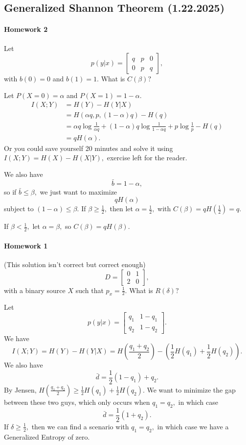 \documentclass[12pt]{article}
\theoremstyle{remark}
\begin{document}
\subsection{Generalized Shannon Theorem (1.22.2025)}
\paragraph{Homework 2}
Let \[p(y|x)=\begin{bmatrix}q&p&0\\0&p&q\end{bmatrix},\] with $b(0)=0$ and $b(1)=1.$ What is $C(\beta)?$

Let $P(X=0)=\alpha$ and $P(X=1)=1-\alpha.$
\begin{align*}I(X;Y)&=H(Y)-H(Y|X)\\&=H(\alpha q,p,(1-\alpha)q)-H(q)\\&=\alpha q\log\frac{1}{\alpha q}+(1-\alpha)q\log\frac{1}{1-\alpha q}+p\log\frac{1}{p}-H(q)\\&=qH(\alpha).\end{align*}
Or you could save yourself 20 minutes and solve it using $I(X;Y)=H(X)-H(X|Y),$ exercise left for the reader.

We also have
\[\bar{b}=1-\alpha,\] so if $\bar{b}\le\beta,$ we just want to maximize
\[qH(\alpha)\] subject to $(1-\alpha)\le \beta.$ If $\beta\ge\frac{1}{2},$ then let $\alpha=\frac{1}{2},$ with $C(\beta)=qH(\frac{1}{2})=q.$

If $\beta<\frac{1}{2},$ let $\alpha=\beta,$ so $C(\beta)=qH(\beta).$

\paragraph{Homework 1}
(This solution isn't correct but correct enough)
\[D=\begin{bmatrix}0&1\\2&0\end{bmatrix},\] with a binary source $X$ such that $p_x=\frac{1}{2}.$ What is $R(\delta)?$

Let 
\[p(y|x)=\begin{bmatrix}
    q_1&1-q_1\\
    q_2&1-q_2
\end{bmatrix}.\]
We have
\[I(X;Y)=H(Y)-H(Y|X)=H\left(\frac{q_1+q_2}{2}\right)-\left(\frac{1}{2}H(q_1)+\frac{1}{2}H(q_2)\right).\]
We also have
\[\bar{d}=\frac{1}{2}(1-q_1)+q_2.\]
By Jensen, $H(\frac{q_1+q_2}{2})\ge\frac{1}{2}H(q_1)+\frac{1}{2}H(q_2).$ We want to minimize the gap between these two guys, which only occurs when $q_1=q_2,$ in which case
\[\bar{d}=\frac{1}{2}(1+q_2).\] If $\delta\ge\frac{1}{2},$ then we can find a scenario with $q_1=q_2,$ in which case we have a Generalized Entropy of zero.
\end{document}
